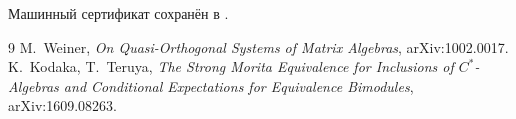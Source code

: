 Машинный сертификат сохранён в
.

\begin{thebibliography}{9}
M.~Weiner,
\emph{On Quasi-Orthogonal Systems of Matrix Algebras},
arXiv:1002.0017.
K.~Kodaka, T.~Teruya,
\emph{The Strong Morita Equivalence for Inclusions of $C^*$-Algebras and
Conditional Expectations for Equivalence Bimodules},
arXiv:1609.08263.
\end{thebibliography}